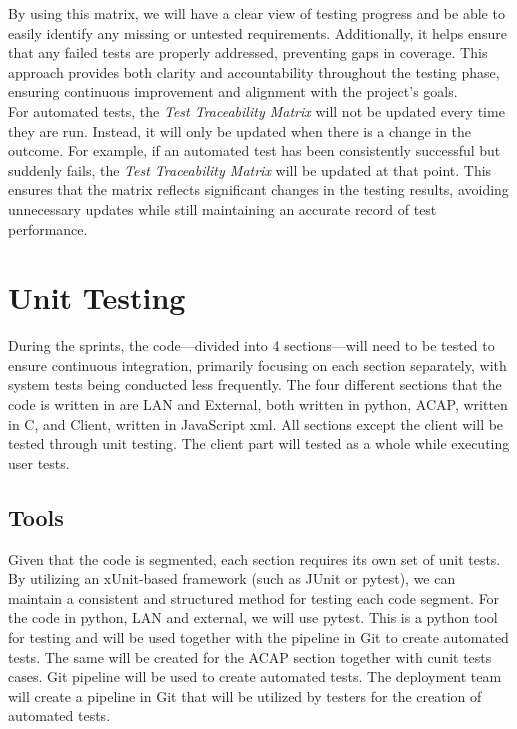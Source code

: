 \documentclass{article}
\begin{document}
By using this matrix, we will have a clear view of testing progress and be able to easily identify any missing or untested requirements. Additionally, it helps ensure that any failed tests are properly addressed, preventing gaps in coverage. This approach provides both clarity and accountability throughout the testing phase, ensuring continuous improvement and alignment with the project’s goals. \\

For automated tests, the \textit{Test Traceability Matrix} will not be updated every time they are run. Instead, it will only be updated when there is a change in the outcome. For example, if an automated test has been consistently successful but suddenly fails, the \textit{Test Traceability Matrix} will be updated at that point. This ensures that the matrix reflects significant changes in the testing results, avoiding unnecessary updates while still maintaining an accurate record of test performance.


\section{Unit Testing}

During the sprints, the code—divided into 4 sections—will need to be tested to ensure continuous integration, primarily focusing on each section separately, with system tests being conducted less frequently. The four different sections that the code is written in are LAN and External, both written in python, ACAP, written in C, and Client, written in JavaScript xml. All sections except the client will be tested through unit testing. The client part will tested as a whole while executing user tests.


\subsection{Tools}
Given that the code is segmented, each section requires its own set of unit tests. By utilizing an xUnit-based framework (such as JUnit or pytest), we can maintain a consistent and structured method for testing each code segment. For the code in python, LAN and external, we will use pytest. This is a python tool for testing and will be used together with the pipeline in Git to create automated tests. The same will be created for the ACAP section together with cunit tests cases. Git pipeline will be used to create automated tests. The deployment team will create a pipeline in Git that will be utilized by testers for the creation of automated tests. 
\end{document}
